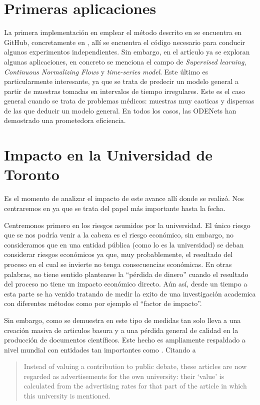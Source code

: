 \documentclass[12pt]{report}
\begin{document}
\section{Primeras aplicaciones}
La primera implementación en emplear el método descrito en \cite{node} se
encuentra en GitHub, concretamente en \cite{torchdiffeq}, allí se encuentra el
código necesario para conducir algunos experimentos independientes. Sin embargo,
en el artículo ya se exploran algunas aplicaciones, en concreto se menciona
el campo de \textit{Supervised learning}, \textit{Continuous Normalizing Flows}
y \textit{time-series model}. Este último es particularmente interesante, ya que
se trata de predecir un modelo general a partir de muestras tomadas en
intervalos de tiempo irregulares. Este es el caso general cuando se trata de
problemas médicos: muestras muy caoticas y dispersas de las que deducir un
modelo general. En todos los casos, las ODENets han demostrado una prometedora
eficiencia.

\section{Impacto en la Universidad de Toronto}
Es el momento de analizar el impacto de este avance allí donde se realizó. Nos
centraremos en \cite{node} ya que se trata del papel más importante hasta la
fecha. 

Centremonos primero en los riesgos asumidos por la universidad. El único riesgo
que se nos podría venir a la cabeza es el riesgo económico, sin embargo, no
consideramos que en una entidad pública (como lo es la universidad) se deban
considerar riesgos económicos ya que, muy probablemente, el resultado del proceso
en el cual se invierte no tenga consecuencias económicas. En otras palabras, no
tiene sentido plantearse la ``pérdida de dinero'' cuando el resultado del
proceso no tiene un impacto económico directo. Aún así, desde un tiempo a esta
parte se ha venido tratando de medir la exito de una investigación academica con
diferentes métodos como por ejemplo el ``factor de impacto''.

Sin embargo, como se demuestra en \cite{stapel} este tipo de medidas tan solo
lleva a una creación masiva de articulos basura y a una pérdida general de
calidad en la producción de documentos científicos. Este hecho es ampliamente
respaldado a nivel mundial con entidades tan importantes como \cite{dora}.
Citando a \cite{manifesto}
\begin{quotation}
Instead of valuing a contribution to public debate, these articles are now
regarded as advertisements for the own university: their ‘value’ is calculated
from the advertising rates for that part of the article in which this university
is mentioned.
\end{quotation}
\end{document}
